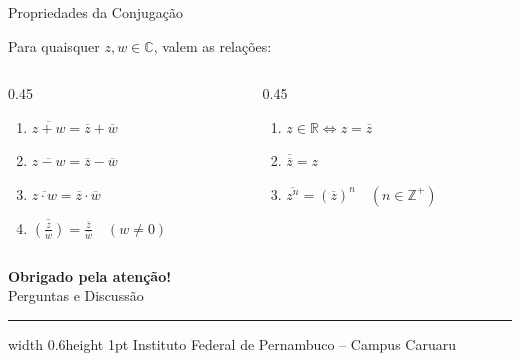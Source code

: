 \documentclass[10pt, aspectratio=169]{beamer}
\begin{document}
\begin{frame}{Propriedades da Conjugação}
  \begin{theorem}
    Para quaisquer $z, w \in \mathbb{C}$, valem as relações:
    \begin{columns}
      \begin{column}{0.45\textwidth}
        \begin{enumerate}
          \item $\overline{z + w} = \overline{z} + \overline{w}$
          \item $\overline{z - w} = \overline{z} - \overline{w}$
          \item $\overline{z \cdot w} = \overline{z} \cdot \overline{w}$
          \item $\overline{\left(\frac{z}{w}\right)} = \frac{\overline{z}}{\overline{w}} \quad (w \neq 0)$
        \end{enumerate}
      \end{column}
      
      \begin{column}{0.45\textwidth}
        \begin{enumerate}
          \item $z \in \mathbb{R} \iff z = \overline{z}$
          \item $\overline{\overline{z}} = z$
          \item $\overline{z^n} = (\overline{z})^n \quad (n \in \mathbb{Z}^+)$
        \end{enumerate}
      \end{column}
    \end{columns}
  \end{theorem}
\end{frame}

\begin{frame}
  \centering
  \vspace{1cm}
  {\Huge \bfseries \color{primary} Obrigado pela atenção!} \\[0.5cm]
  {\large Perguntas e Discussão} \\[1cm]
  \hrule width 0.6\paperwidth height 1pt
  \vspace{0.5cm}
  {\small \sffamily \color{gray} Instituto Federal de Pernambuco -- Campus Caruaru}
\end{frame}
\end{document}
